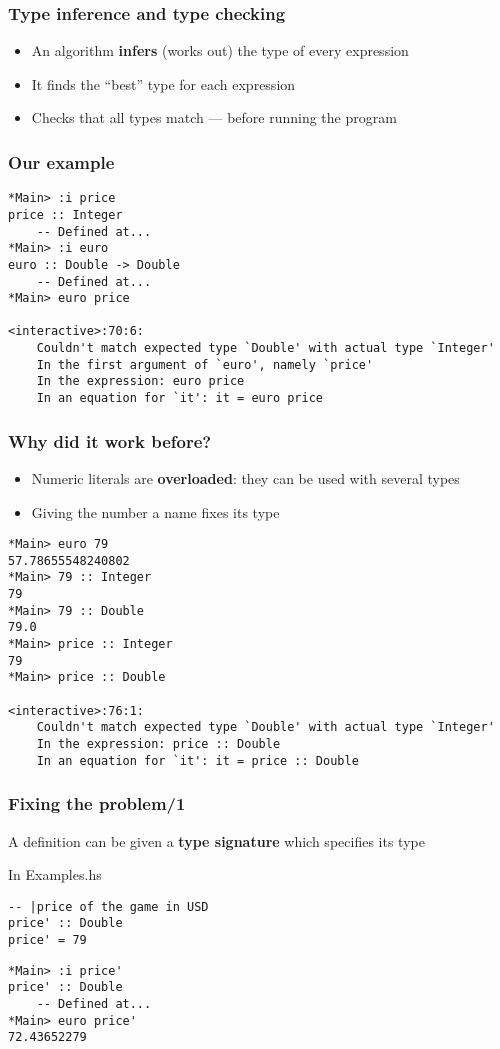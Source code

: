 \documentclass{beamer}
\begin{document}
\begin{frame}
  \frametitle{Type inference and type checking}
  \begin{itemize}
  \item An algorithm \textbf{infers} (works out) the type of every
    expression
  \item It finds the ``best'' type for each expression
  \item Checks that all types match --- before running the program
  \end{itemize}
\end{frame}
\begin{frame}[fragile]
  \frametitle{Our example}
\begin{verbatim}
*Main> :i price
price :: Integer
  	-- Defined at...
*Main> :i euro
euro :: Double -> Double
  	-- Defined at...
*Main> euro price

<interactive>:70:6:
    Couldn't match expected type `Double' with actual type `Integer'
    In the first argument of `euro', namely `price'
    In the expression: euro price
    In an equation for `it': it = euro price
\end{verbatim}
\end{frame}
\begin{frame}[fragile]
  \frametitle{Why did it work before?}
  \begin{itemize}
  \item Numeric literals are \textbf{overloaded}: they can be
    used with several types
  \item  Giving the number a name fixes its type
  \end{itemize}
\begin{verbatim}
*Main> euro 79
57.78655548240802
*Main> 79 :: Integer
79
*Main> 79 :: Double
79.0
*Main> price :: Integer
79
*Main> price :: Double

<interactive>:76:1:
    Couldn't match expected type `Double' with actual type `Integer'
    In the expression: price :: Double
    In an equation for `it': it = price :: Double
\end{verbatim}
\end{frame}
\begin{frame}[fragile]
  \frametitle{Fixing the problem/1}
  A definition can be given a \textbf{type signature} which specifies
  its type
\begin{block}{In Examples.hs}
\begin{lstlisting}
-- |price of the game in USD
price' :: Double
price' = 79
\end{lstlisting}
  \end{block}
\begin{verbatim}
*Main> :i price'
price' :: Double
  	-- Defined at...
*Main> euro price'
72.43652279
\end{verbatim}
\end{frame}
\end{document}
